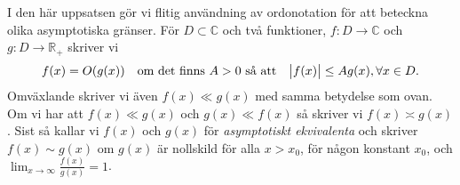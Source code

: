 I den här uppsatsen gör vi flitig användning av ordonotation för att beteckna olika asymptotiska gränser. För $D \subset \mathbb{C}$ och två funktioner, $f: D \to \mathbb{C}$ och $g: D \to \mathbb{R}_+$ skriver vi
\begin{align*}
    f(x) = O(g(x)) \quad \text{om det finns } A > 0 \text{ så att} \quad \abs{f(x)} \leq A g(x), \forall x \in D.
\end{align*}
Omväxlande skriver vi även \(f(x) \ll g(x)\) med samma betydelse som ovan. Om vi har att \(f(x) \ll g(x)\) och \(g(x) \ll f(x)\) så skriver vi \(f(x) \asymp g(x)\). Sist så kallar vi $f(x)$ och $g(x)$ för \textit{asymptotiskt ekvivalenta} och skriver \(f(x) \sim g(x)\) om $g(x)$ är nollskild för alla \(x > x_0\), för någon konstant \(x_0\), och \(\lim_{x \to \infty} \frac{f(x)}{g(x)} = 1\).